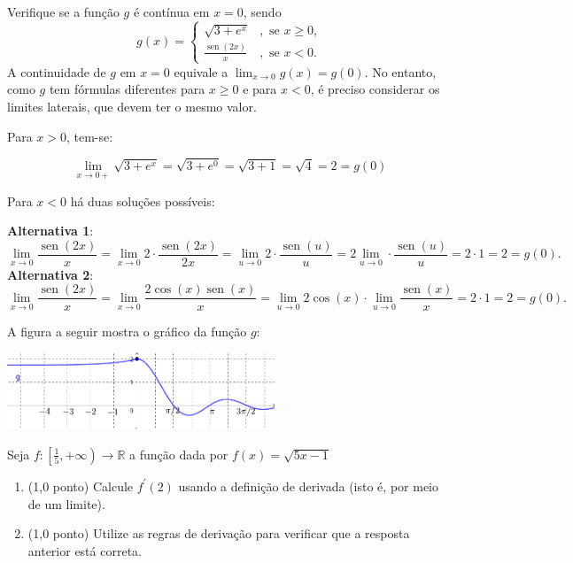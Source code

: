 \documentclass[12pt,a4paper]{article}
\newcommand*\sen{\operatorname{sen}}
\newcommand*\R{\mathbb{R}}
\begin{document}
\begin{ExerciseList}
\Exercise[title={2,0}] Verifique se a função $g$ é contínua em $x = 0$, sendo
\[
g(x) =
\begin{cases}
  \sqrt{3 + e^x} &, \text{ se } x \geq 0, \\
  \frac{\sen(2x)}{x} &, \text{ se } x < 0.
\end{cases}
\]
\Answer A continuidade de $g$ em $x=0$ equivale a $\lim_{x \to 0} g(x) = g(0)$. No entanto, como $g$ tem fórmulas diferentes para $x \geq 0$ e para $x < 0$, é preciso considerar os limites laterais, que devem ter o mesmo valor.

Para $x > 0$, tem-se:

\[
  \lim_{x \to 0+} \sqrt{3 + e^x} = \sqrt{3 + e^0} = \sqrt{3 + 1} = \sqrt{4} = 2 = g(0)
\]

Para $x < 0$ há duas soluções possíveis:

\textbf{Alternativa 1}:
\[
    \lim_{x \to 0} \frac{\sen(2x)}{x}
  = \lim_{x \to 0} 2\cdot \frac{\sen(2x)}{2x}
  = \lim_{u \to 0} 2\cdot \frac{\sen(u)}{u}
  = 2 \lim_{u \to 0} \cdot \frac{\sen(u)}{u}
  = 2 \cdot 1
  = 2
  = g(0).
\]
\textbf{Alternativa 2}:
\[
    \lim_{x \to 0} \frac{\sen(2x)}{x}
  = \lim_{x \to 0} \frac{2\cos(x)\sen(x)}{x}
  = \lim_{u \to 0} 2\cos(x) \cdot \lim_{u \to 0}\frac{\sen(x)}{x}
  = 2 \cdot 1
  = 2
  = g(0).
\]

A figura a seguir mostra o gráfico da função $g$:

\begin{center}
\includegraphics[width=8cm]{img/prova-2-nex-função-por-partes.pdf}
\end{center}


\Exercise[title={2,0}] Seja $f: \left[\frac{1}{5}, +\infty\right) \to \R$ a função dada por $f(x) = \sqrt{5x - 1}$
\begin{enumerate}
\item (1,0 ponto) Calcule $f^\prime(2)$ usando a definição de derivada (isto é, por meio de um limite).\color{black}
\item (1,0 ponto) Utilize as regras de derivação para verificar que a resposta anterior está correta.
\end{enumerate}


\end{ExerciseList}
\end{document}

